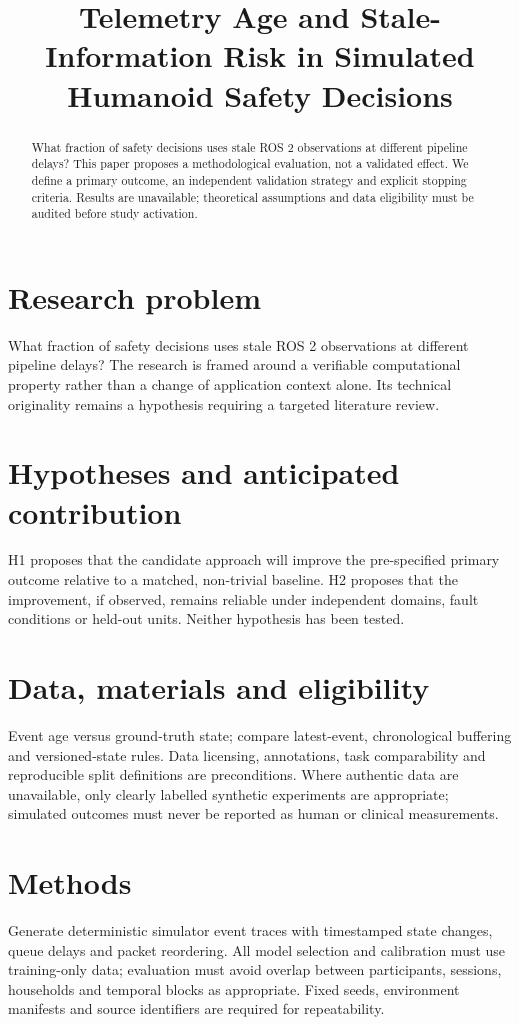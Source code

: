 \documentclass[11pt,a4paper]{article}
\title{Telemetry Age and Stale-Information Risk in Simulated Humanoid Safety Decisions}
\author{}
\date{}
\begin{document}
\maketitle
\begin{abstract}
What fraction of safety decisions uses stale ROS 2 observations at different pipeline delays? This paper proposes a methodological evaluation, not a validated effect. We define a primary outcome, an independent validation strategy and explicit stopping criteria. Results are unavailable; theoretical assumptions and data eligibility must be audited before study activation.
\end{abstract}
\section{Research problem}
What fraction of safety decisions uses stale ROS 2 observations at different pipeline delays? The research is framed around a verifiable computational property rather than a change of application context alone. Its technical originality remains a hypothesis requiring a targeted literature review.
\section{Hypotheses and anticipated contribution}
H1 proposes that the candidate approach will improve the pre-specified primary outcome relative to a matched, non-trivial baseline. H2 proposes that the improvement, if observed, remains reliable under independent domains, fault conditions or held-out units. Neither hypothesis has been tested.
\section{Data, materials and eligibility}
Event age versus ground-truth state; compare latest-event, chronological buffering and versioned-state rules. Data licensing, annotations, task comparability and reproducible split definitions are preconditions. Where authentic data are unavailable, only clearly labelled synthetic experiments are appropriate; simulated outcomes must never be reported as human or clinical measurements.
\section{Methods}
Generate deterministic simulator event traces with timestamped state changes, queue delays and packet reordering. All model selection and calibration must use training-only data; evaluation must avoid overlap between participants, sessions, households and temporal blocks as appropriate. Fixed seeds, environment manifests and source identifiers are required for repeatability.
\end{document}
